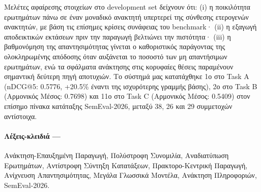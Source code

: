 Μελέτες αφαίρεσης στοιχείων στο development set δείχνουν ότι: (i) η ποικιλότητα ερωτημάτων
πάνω σε έναν μοναδικό ανακτητή υπερτερεί της σύνθεσης ετερογενών ανακτητών, με βάση
τις επίσημες κρίσεις συνάφειας του benchmark· (ii) η εξαγωγή αποδεικτικών εκτάσεων πριν
την παραγωγή βελτιώνει την πιστότητα· (iii) η βαθμονόμηση της απαντησιμότητας γίνεται ο καθοριστικός παράγοντας της ολοκληρωμένης
απόδοσης όταν αυξάνεται το ποσοστό των μη απαντήσιμων ερωτημάτων, ενώ τα σφάλματα ανάκτησης
στις κορυφαίες θέσεις παραμένουν σημαντική δεύτερη πηγή αποτυχιών. Το σύστημά μας
κατατάχθηκε 1ο στο Task A (nDCG@5: 0.5776, +20.5\% έναντι της ισχυρότερης γραμμής
βάσης), 2ο στο Task B (Αρμονικός Μέσος: 0.7698) και 11ο στο Task C (Αρμονικός Μέσος:
0.5409) στον επίσημο πίνακα κατάταξης SemEval-2026, μεταξύ 38, 26 και 29 συμμετοχών
αντίστοιχα.
 
\paragraph*{Λέξεις-κλειδιά ---}
Ανάκτηση-Επαυξημένη Παραγωγή, Πολύστροφη Συνομιλία, Αναδιατύπωση Ερωτημάτων,
Αντίστροφη Σύντηξη Κατατάξεων, Πρακτορο-Κεντρική Παραγωγή, Ανίχνευση
Απαντησιμότητας, Μεγάλα Γλωσσικά Μοντέλα, Ανάκτηση Πληροφοριών, SemEval-2026.
